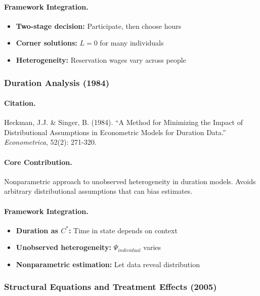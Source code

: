\paragraph{Framework Integration.}
\begin{itemize}
  \item \textbf{Two-stage decision:} Participate, then choose hours
  \item \textbf{Corner solutions:} $L = 0$ for many individuals
  \item \textbf{Heterogeneity:} Reservation wages vary across people
\end{itemize}

\subsubsection{Duration Analysis (1984)}

\paragraph{Citation.}
Heckman, J.J. \& Singer, B. (1984). ``A Method for Minimizing the Impact
of Distributional Assumptions in Econometric Models for Duration Data.''
\emph{Econometrica}, 52(2): 271-320.

\paragraph{Core Contribution.}
Nonparametric approach to unobserved heterogeneity in duration models.
Avoids arbitrary distributional assumptions that can bias estimates.

\paragraph{Framework Integration.}
\begin{itemize}
  \item \textbf{Duration as $C^*$:} Time in state depends on context
  \item \textbf{Unobserved heterogeneity:} $\Psi_{individual}$ varies
  \item \textbf{Nonparametric estimation:} Let data reveal distribution
\end{itemize}

\subsubsection{Structural Equations and Treatment Effects (2005)}

